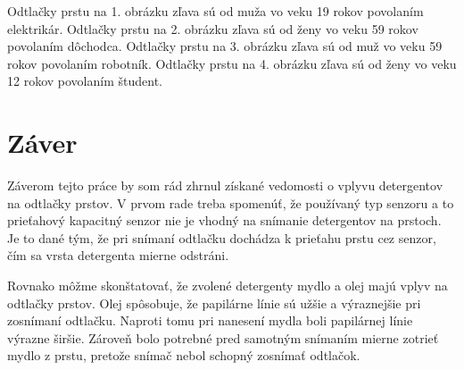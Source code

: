 \documentclass[12pt,a4paper,titlepage,final]{article}
\begin{document}
Odtlačky prstu na 1. obrázku zľava sú od muža vo veku 19 rokov povolaním elektrikár.
Odtlačky prstu na 2. obrázku zľava sú od ženy vo veku 59 rokov povolaním dôchodca.
Odtlačky prstu na 3. obrázku zľava sú od muž vo veku 59 rokov povolaním robotník.
Odtlačky prstu na 4. obrázku zľava sú od ženy vo veku 12 rokov povolaním študent.

\section{Záver}
Záverom tejto práce by som rád zhrnul získané vedomosti o vplyvu detergentov na odtlačky prstov. V prvom rade treba spomenúť, že používaný typ senzoru a to prieťahový kapacitný senzor nie je vhodný na snímanie detergentov na prstoch. Je to dané tým, že pri snímaní odtlačku dochádza k prieťahu prstu cez senzor, čím sa vrsta detergenta mierne odstráni. 
 
Rovnako môžme skonštatovať, že zvolené detergenty mydlo a olej majú vplyv na odtlačky prstov. Olej spôsobuje, že papilárne línie sú užšie a výraznejšie pri zosnímaní odtlačku. Naproti tomu pri nanesení mydla boli papilárnej línie výrazne širšie. Zároveň bolo potrebné pred samotným snímaním mierne zotrieť mydlo z prstu, pretože snímač nebol schopný zosnímať odtlačok.
\end{document}
